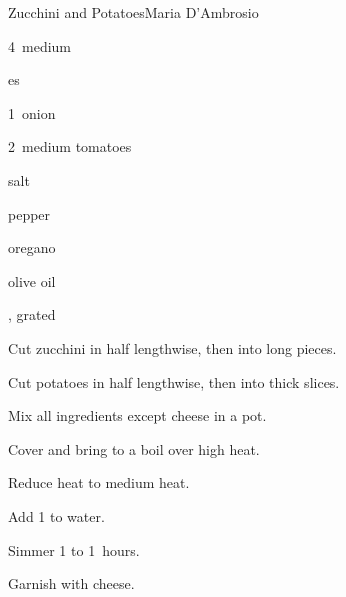 \begin{recipe}{Zucchini and Potatoes}{Maria D'Ambrosio}{}

\begin{ingredients}
\item 4~medium 
\item {}es
\item 1~onion
\item 2~medium tomatoes
\item salt
\item pepper
\item oregano
\item olive oil
\item {}, grated
\end{ingredients}

\begin{directions}
\item Cut zucchini in half lengthwise, then into  long pieces.
\item Cut potatoes in half lengthwise, then into \inch{\half} thick slices.
\item Mix all ingredients except cheese in a pot.
\item Cover and bring to a boil over high heat.
\item Reduce heat to medium heat.
\item Add 1 to  water.
\item Simmer 1 to 1\half~hours.
\item Garnish with cheese.
\end{directions}

\end{recipe}
